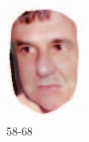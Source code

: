 \begin{figure}[t]
\begin{subfigure}[t]{0.2\textwidth}
		\includegraphics[width=\textwidth]{ilaware_cover6.png}
		\caption{58-68}
	\end{subfigure}		
	\begin{subfigure}[t]{0.2\textwidth}

\end{subfigure}
\end{figure}
